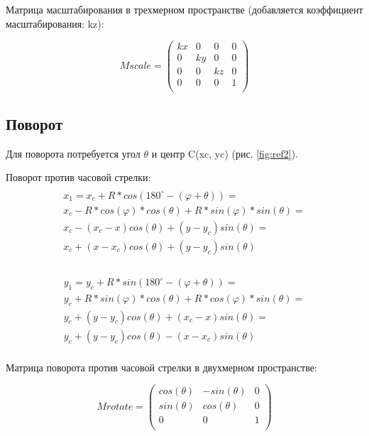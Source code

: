 Матрица масштабирования в трехмерном пространстве (добавляется коэффициент масштабирования: kz):

\begin{equation}
	Mscale = \left(
	\begin{array}{cccc}
			kx & 0  & 0  & 0 \\
			0  & ky & 0  & 0 \\
			0  & 0  & kz & 0 \\
			0  & 0  & 0  & 1 \\
		\end{array}
	\right)
\end{equation}

\subsection {Поворот}

Для поворота потребуется угол  $\theta$ и центр C(xc, yc) (рис. \ref{fig:ref2}).
\begin{figure}[ht!]
\end{figure}

Поворот против часовой стрелки:
\begin{multline}
	\\
	x_1 = x_c + R*cos(180^{\circ}-(\varphi +  \theta)) = \\
	x_c - R*cos(\varphi)*cos(\theta) + R*sin(\varphi)*sin(\theta) = \\
	x_c - (x_c - x)cos(\theta) + (y - y_c)sin(\theta) = \\
	x_c + (x - x_c)cos(\theta) + (y - y_c)sin(\theta) \\
\end{multline}

\begin{multline}
	\\
	y_1 = y_c + R*sin(180^{\circ}-(\varphi +  \theta)) = \\
	y_c + R*sin(\varphi)*cos(\theta) + R*cos(\varphi)*sin(\theta) = \\
	y_c + (y - y_c)cos(\theta) + (x_c- x)sin(\theta) = \\
	y_c + (y - y_c)cos(\theta) - (x - x_c)sin(\theta) \\
\end{multline}

Матрица поворота против часовой стрелки в двухмерном пространстве:

\begin{equation}
	Mrotate = \left(
	\begin{array}{cccc}
			cos(\theta) & -sin(\theta) & 0 \\
			sin(\theta) & cos(\theta)  & 0 \\
			0           & 0            & 1 \\
		\end{array}
	\right)
\end{equation}

